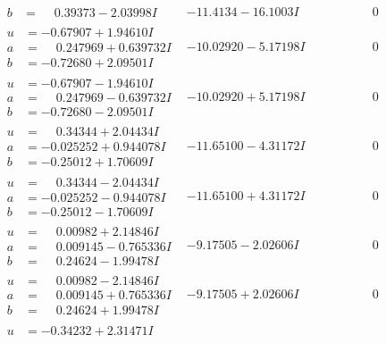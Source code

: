 \documentclass[1p]{elsarticle_modified}
\theoremstyle{definition}
\begin{document}
$$\begin{array}{c|c|c}
\begin{aligned}
b &= \phantom{-}0.39373 - 2.03998 I\end{aligned}
 & -11.4134 - 16.1003 I & \phantom{-0.000000 } 0 \\ \hline\begin{aligned}
u &= -0.67907 + 1.94610 I \\
a &= \phantom{-}0.247969 + 0.639732 I \\
b &= -0.72680 + 2.09501 I\end{aligned}
 & -10.02920 - 5.17198 I & \phantom{-0.000000 } 0 \\ \hline\begin{aligned}
u &= -0.67907 - 1.94610 I \\
a &= \phantom{-}0.247969 - 0.639732 I \\
b &= -0.72680 - 2.09501 I\end{aligned}
 & -10.02920 + 5.17198 I & \phantom{-0.000000 } 0 \\ \hline\begin{aligned}
u &= \phantom{-}0.34344 + 2.04434 I \\
a &= -0.025252 + 0.944078 I \\
b &= -0.25012 + 1.70609 I\end{aligned}
 & -11.65100 - 4.31172 I & \phantom{-0.000000 } 0 \\ \hline\begin{aligned}
u &= \phantom{-}0.34344 - 2.04434 I \\
a &= -0.025252 - 0.944078 I \\
b &= -0.25012 - 1.70609 I\end{aligned}
 & -11.65100 + 4.31172 I & \phantom{-0.000000 } 0 \\ \hline\begin{aligned}
u &= \phantom{-}0.00982 + 2.14846 I \\
a &= \phantom{-}0.009145 - 0.765336 I \\
b &= \phantom{-}0.24624 - 1.99478 I\end{aligned}
 & -9.17505 - 2.02606 I & \phantom{-0.000000 } 0 \\ \hline\begin{aligned}
u &= \phantom{-}0.00982 - 2.14846 I \\
a &= \phantom{-}0.009145 + 0.765336 I \\
b &= \phantom{-}0.24624 + 1.99478 I\end{aligned}
 & -9.17505 + 2.02606 I & \phantom{-0.000000 } 0 \\ \hline\begin{aligned}
u &= -0.34232 + 2.31471 I \\

\end{aligned}
\end{array}$$
\end{document}
